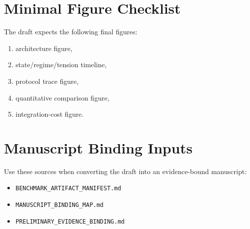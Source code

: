 \documentclass[11pt]{article}
\begin{document}
\section{Minimal Figure Checklist}

The draft expects the following final figures:
\begin{enumerate}[leftmargin=*]
  \item architecture figure,
  \item state/regime/tension timeline,
  \item protocol trace figure,
  \item quantitative comparison figure,
  \item integration-cost figure.
\end{enumerate}

\section{Manuscript Binding Inputs}

Use these sources when converting the draft into an evidence-bound manuscript:
\begin{itemize}[leftmargin=*]
  \item \texttt{BENCHMARK\_ARTIFACT\_MANIFEST.md}
  \item \texttt{MANUSCRIPT\_BINDING\_MAP.md}
  \item \texttt{PRELIMINARY\_EVIDENCE\_BINDING.md}
\end{itemize}
\end{document}
